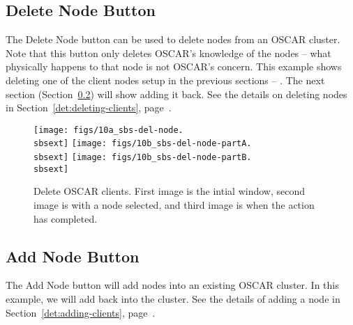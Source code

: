 
\subsection{Delete Node Button}
\label{app:sbs-delete-node}

The Delete Node button can be used to delete nodes from an OSCAR
cluster.  Note that this button only deletes OSCAR's knowledge of the
nodes -- what physically happens to that node is not OSCAR's concern.
This example shows deleting one of the client nodes setup in the
previous sections -- .  The next section
(Section~\ref{app:sbs-add-node}) will show adding it back.  See the
details on deleting nodes in Section~\ref{det:deleting-clients},
page~\pageref{det:deleting-clients}.

\begin{figure}[h!]
  \begin{center}
    \centerline{
      \texttt{[image: figs/10a\_sbs-del-node.\\sbsext]}
      \hspace{\imghskip}
      \texttt{[image: figs/10b\_sbs-del-node-partA.\\sbsext]}
      \hspace{\imghskip}
      \texttt{[image: figs/10b\_sbs-del-node-partB.\\sbsext]}
      }
    \caption[Delete OSCAR Clients.]{Delete OSCAR clients.  First image
    is the intial window, second image is with a node selected, and
    third image is when the action has completed.}
    \label{fig:sbs-del-node1}
  \end{center}
\end{figure}



\subsection{Add Node Button}
\label{app:sbs-add-node}

The Add Node button will add nodes into an existing OSCAR cluster.  In
this example, we will add back  into the cluster.
See the details of adding a node in Section~\ref{det:adding-clients},
page~\pageref{det:adding-clients}.

